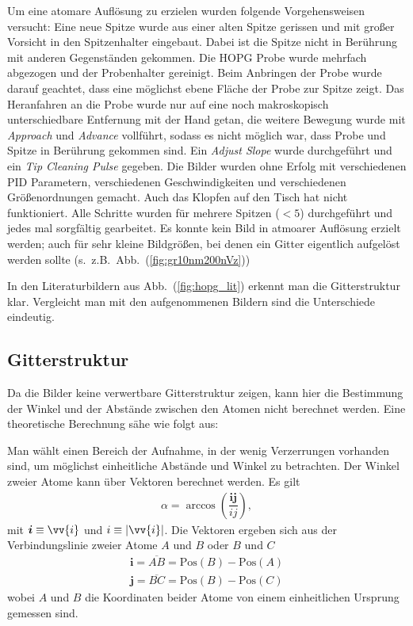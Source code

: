 \documentclass[sn-mathphys-num,iicol]{sn-jnl}
\theoremstyle{thmstyleone}
\theoremstyle{thmstyletwo}
\theoremstyle{thmstylethree}
\begin{document}
Um eine atomare Auflösung zu erzielen wurden folgende Vorgehensweisen versucht:
Eine neue Spitze wurde aus einer alten Spitze gerissen und mit großer Vorsicht in den Spitzenhalter eingebaut.
Dabei ist die Spitze nicht in Berührung mit anderen Gegenständen gekommen.
Die HOPG Probe wurde mehrfach abgezogen und der Probenhalter gereinigt.
Beim Anbringen der Probe wurde darauf geachtet, dass eine möglichst ebene Fläche der Probe zur Spitze zeigt.
Das Heranfahren an die Probe wurde nur auf eine noch makroskopisch unterschiedbare Entfernung mit der Hand getan, die weitere Bewegung wurde mit \textit{Approach} und \textit{Advance} vollführt, sodass es nicht möglich war, dass Probe und Spitze in Berührung gekommen sind.
Ein \textit{Adjust Slope} wurde durchgeführt und ein \textit{Tip Cleaning Pulse} gegeben.
Die Bilder wurden ohne Erfolg mit verschiedenen PID Parametern, verschiedenen Geschwindigkeiten und verschiedenen Größenordnungen gemacht.
Auch das Klopfen auf den Tisch hat nicht funktioniert.
Alle Schritte wurden für mehrere Spitzen ($<5$) durchgeführt und jedes mal sorgfältig gearbeitet.
Es konnte kein Bild in atmoarer Auflösung erzielt werden; auch für sehr kleine Bildgrößen, bei denen ein Gitter eigentlich aufgelöst werden sollte (s.\ z.B.\ Abb.\ (\ref{fig:gr10nm200nVz}))

In den Literaturbildern aus Abb.\ (\ref{fig:hopg_lit}) erkennt man die Gitterstruktur klar.
Vergleicht man mit den aufgenommenen Bildern sind die Unterschiede eindeutig.

\subsection{Gitterstruktur} \label{sec:theo}
Da die Bilder keine verwertbare Gitterstruktur zeigen, kann hier die Bestimmung der Winkel und der Abstände zwischen den Atomen nicht berechnet werden.
Eine theoretische Berechnung sähe wie folgt aus:

Man wählt einen Bereich der Aufnahme, in der wenig Verzerrungen vorhanden sind, um möglichst einheitliche Abstände und Winkel zu betrachten.
Der Winkel zweier Atome kann über Vektoren berechnet werden.
Es gilt
\begin{align} 
  \alpha =\arccos\left(\dfrac{\boldsymbol{i} \boldsymbol{j} }{ij}\right)
,\end{align} 
mit $\boldsymbol{i} \equiv\vv{i}$ und $i\equiv |\vv{i}|$.
Die Vektoren ergeben sich aus der Verbindungslinie zweier Atome $A$ und $B$ oder $B$ und $C$
\begin{align} 
  \boldsymbol{i} =\overline{AB}=\text{Pos}(B)-\text{Pos}(A)\\
  \boldsymbol{j} =\overline{BC}=\text{Pos}(B)-\text{Pos}(C)
\end{align} 
wobei $A$ und $B$ die Koordinaten beider Atome von einem einheitlichen Ursprung gemessen sind.
\end{document}
